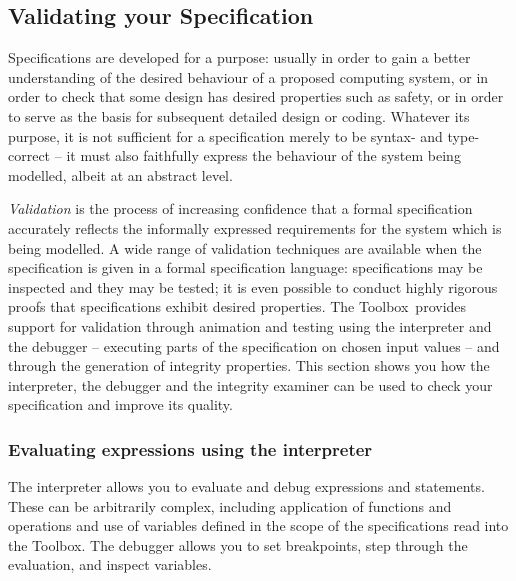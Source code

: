 \documentclass[\pformat,12pt]{article}
\newcommand{\Toolbox}{Toolbox}
\begin{document}

\subsection{Validating your Specification}

Specifications are developed for a purpose: usually in order to gain a
better understanding of the desired behaviour of a proposed computing
system, or in order to check that some design has desired properties
such as safety, or in order to serve as the basis for subsequent
detailed design or coding. Whatever its purpose, it is not sufficient
for a specification merely to be syntax- and type-correct -- it must
also faithfully express the behaviour of the system being modelled,
albeit at an abstract level.

{\em Validation\/} is the process of increasing confidence that a
formal specification accurately reflects the informally expressed
requirements for the system which is being modelled. A wide range of
validation 
techniques are available when the specification is given in a formal
specification language: specifications may be inspected and they may
be tested; it is even possible to conduct highly rigorous proofs that
specifications exhibit desired properties. The \Toolbox\ provides
support for validation through animation and testing using the
interpreter and the debugger -- executing parts
of the specification on chosen input values -- and through the
generation of integrity properties. This section shows you
how the interpreter, the debugger and the integrity examiner can be
used to check your specification and improve its quality.


\subsubsection{Evaluating expressions using the interpreter}
\label{interpreter}

The interpreter allows you to evaluate and debug expressions and
statements.  These can be arbitrarily complex, including application
of functions and operations and use of variables defined in the scope
of the specifications read into the \Toolbox.  The debugger allows you
to set breakpoints, step through the evaluation, and inspect variables.
\end{document}
